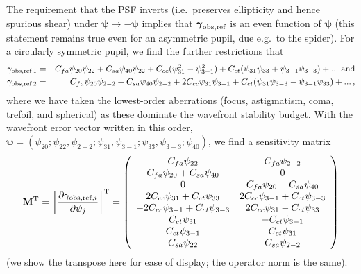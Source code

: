 The requirement that the PSF inverts (i.e.\ preserves ellipticity and hence spurious shear) under ${\boldsymbol\psi}\rightarrow-{\boldsymbol\psi}$ implies that ${\boldsymbol\gamma}_{\rm obs,ref}$ is an even function of ${\boldsymbol\psi}$ (this statement remains true even for an asymmetric pupil, due e.g.\ to the spider). For a circularly symmetric pupil, we find the further restrictions that
\begin{eqnarray}
\gamma_{\rm obs,ref\,1} &=& C_{fa} \psi_{20} \psi_{22} + C_{sa} \psi_{40} \psi_{22}
+ C_{cc} (\psi_{31}^2-\psi_{3-1}^2) + C_{ct} (\psi_{31}\psi_{33} + \psi_{3-1}\psi_{3-3})
+ ...~{\rm and}
\nonumber \\
\gamma_{\rm obs,ref\,2} &=& C_{fa} \psi_{20} \psi_{2-2} + C_{sa} \psi_{40} \psi_{2-2}
+ 2C_{cc} \psi_{31} \psi_{3-1} + C_{ct} (\psi_{31}\psi_{3-3} - \psi_{3-1}\psi_{33})
+ ...\,,
\end{eqnarray}
where we have taken the lowest-order aberrations (focus, astigmatism, coma, trefoil, and spherical) as these dominate the wavefront stability budget. With the wavefront error vector written in this order, ${\boldsymbol\psi} = (\psi_{20}; \psi_{22},\psi_{2-2}; \psi_{31},\psi_{3-1}; \psi_{33},\psi_{3-3}; \psi_{40})$, we find a sensitivity matrix
\begin{equation}
{\bf M}^{\rm T} = \left[ \frac{\partial \gamma_{{\rm obs,ref},i}}{\partial\psi_j} \right]^{\rm T}
= \left( \begin{array}{cc}
C_{fa}\psi_{22}  & C_{fa}\psi_{2-2} \\
C_{fa}\psi_{20}+C_{sa}\psi_{40} & 0 \\
0 & C_{fa}\psi_{20}+C_{sa}\psi_{40} \\
2C_{cc}\psi_{31}+C_{ct}\psi_{33} & 2C_{cc}\psi_{3-1}+C_{ct}\psi_{3-3} \\
-2C_{cc}\psi_{3-1}+C_{ct}\psi_{3-3} & 2C_{cc}\psi_{31}-C_{ct}\psi_{33} \\
C_{ct}\psi_{31} & -C_{ct}\psi_{3-1} \\
C_{ct}\psi_{3-1} & C_{ct}\psi_{31} \\
C_{sa}\psi_{22} & C_{sa}\psi_{2-2}
\end{array} \right)
\label{eq:TheMatrix}
\end{equation}
(we show the transpose here for ease of display; the operator norm is the same).

